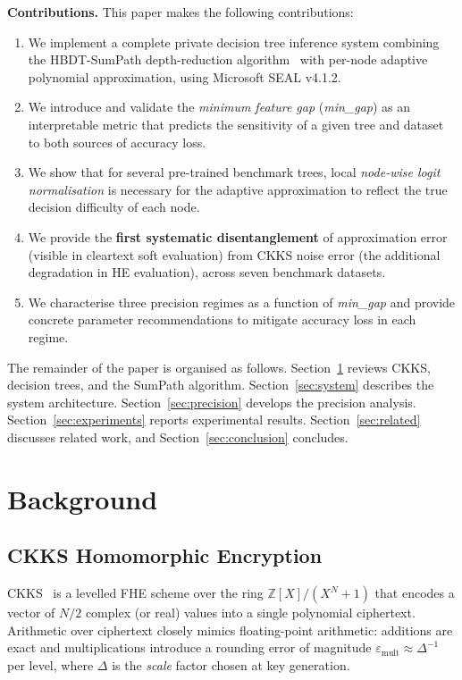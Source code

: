 \documentclass[runningheads]{llncs}
\begin{document}
\textbf{Contributions.}  This paper makes the following contributions:
\begin{enumerate}
  \item We implement a complete private decision tree inference system
        combining the HBDT-SumPath depth-reduction
        algorithm~\cite{shin2022privacy} with per-node adaptive polynomial
        approximation, using Microsoft SEAL v4.1.2.
  \item We introduce and validate the \emph{minimum feature gap}
        (\textit{min\_gap}) as an interpretable metric that predicts the
        sensitivity of a given tree and dataset to both sources of accuracy
        loss.
  \item We show that for several pre-trained benchmark trees, local
        \emph{node-wise logit normalisation} is necessary for the adaptive
        approximation to reflect the true decision difficulty of each node.
  \item We provide the \textbf{first systematic disentanglement} of
        approximation error (visible in cleartext soft evaluation) from CKKS
        noise error (the additional degradation in HE evaluation), across
        seven benchmark datasets.
  \item We characterise three precision regimes as a function of
        \textit{min\_gap} and provide concrete parameter recommendations to
        mitigate accuracy loss in each regime.
\end{enumerate}

The remainder of the paper is organised as follows.
Section~\ref{sec:background} reviews CKKS, decision trees, and the
SumPath algorithm.  Section~\ref{sec:system} describes the system
architecture.  Section~\ref{sec:precision} develops the precision analysis.
Section~\ref{sec:experiments} reports experimental results.
Section~\ref{sec:related} discusses related work, and
Section~\ref{sec:conclusion} concludes.

\section{Background}
\label{sec:background}

\subsection{CKKS Homomorphic Encryption}

CKKS~\cite{cheon2017homomorphic} is a levelled FHE scheme over the ring
$\mathbb{Z}[X]/(X^N+1)$ that encodes a vector of $N/2$ complex (or real)
values into a single polynomial ciphertext.  Arithmetic over ciphertext
closely mimics floating-point arithmetic: additions are exact and
multiplications introduce a rounding error of magnitude
$\varepsilon_{\mathrm{mult}} \approx \Delta^{-1}$ per level, where $\Delta$
is the \emph{scale} factor chosen at key generation.
\end{document}
